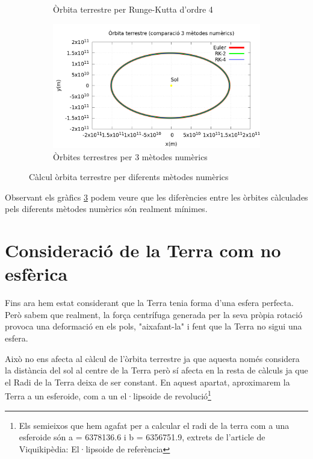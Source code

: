 \documentclass[11pt]{article}
\begin{document}
\begin{figure}[H]
\begin{subfigure}{0.5\textwidth}
        \caption{Òrbita terrestre per Runge-Kutta d'ordre 4}
        \label{fig: orbitaRK4}
    \end{subfigure}
    \vspace{0.01\textwidth}%
    \begin{subfigure}{0.5\textwidth}
        \centering
        \includegraphics[width=\textwidth]{orbita3met.PNG}
        \caption{Òrbites terrestres per 3 mètodes numèrics}
        \label{fig: orbita3met}
    \end{subfigure}
    \caption{Càlcul òrbita terrestre per diferents mètodes numèrics}
    \label{fig: grafics3met}
\end{figure}

Observant els gràfics \ref{fig: grafics3met} podem veure que les diferències entre les òrbites càlculades pels diferents mètodes numèrics són realment mínimes.

\section{Consideració de la Terra com no esfèrica}\label{sec: terranoesfera}
Fins ara hem estat considerant que la Terra tenia forma d'una esfera perfecta. Però sabem que realment, la força centrífuga generada per la seva pròpia rotació provoca una deformació en els pols, "aixafant-la" i fent que la Terra no sigui una esfera.

Això no ens afecta al càlcul de l'òrbita terrestre ja que aquesta només considera la distància del sol al centre de la Terra però sí afecta en la resta de càlculs ja que el Radi de la Terra deixa de ser constant. En aquest apartat, aproximarem la Terra a un esferoide, com a un el·lipsoide de revolució\footnote{\label{nota: elipsoide}Els semieixos que hem agafat per a calcular el radi de la terra com a una esferoide són a = 6378136.6 i b = 6356751.9, extrets de l'article de Viquikipèdia: El·lipsoide de referència}
\end{document}
